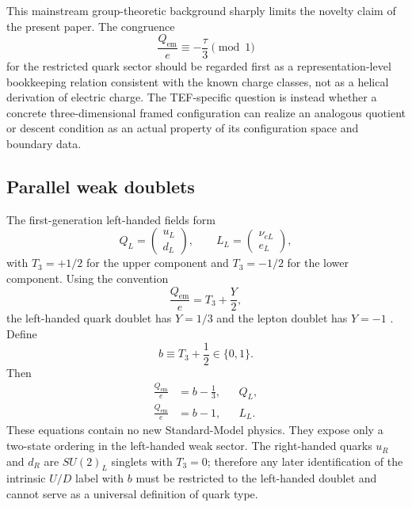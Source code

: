 \documentclass[aps,prd,reprint,superscriptaddress,nofootinbib,longbibliography,floatfix]{revtex4-2}
\newcommand{\Qem}{Q_{\mathrm{em}}}
\begin{document}
This mainstream group-theoretic background sharply limits the novelty claim of the present paper. The congruence
\begin{equation}
\boxed{\frac{\Qem}{e}\equiv-\frac{\tau}{3}\pmod1}
\label{eq:chargecongruence}
\end{equation}
for the restricted quark sector should be regarded first as a representation-level bookkeeping relation consistent with the known charge classes, not as a helical derivation of electric charge. The TEF-specific question is instead whether a concrete three-dimensional framed configuration can realize an analogous quotient or descent condition as an actual property of its configuration space and boundary data.

\subsection{Parallel weak doublets}

The first-generation left-handed fields form
\begin{equation}
Q_L=\begin{pmatrix}u_L\\ d_L\end{pmatrix},
\qquad
L_L=\begin{pmatrix}\nu_{eL}\\ e_L\end{pmatrix},
\label{eq:doublets}
\end{equation}
with $T_3=+1/2$ for the upper component and $T_3=-1/2$ for the lower component. Using the convention
\begin{equation}
\frac{\Qem}{e}=T_3+\frac{Y}{2},
\label{eq:smcharge}
\end{equation}
the left-handed quark doublet has $Y=1/3$ and the lepton doublet has $Y=-1$ \cite{PDG2026}. Define
\begin{equation}
b\equiv T_3+\frac12\in\{0,1\}.
\label{eq:bindex}
\end{equation}
Then
\begin{align}
\frac{\Qem}{e}&=b-\frac13,
&&Q_L,\label{eq:qbinary}\\
\frac{\Qem}{e}&=b-1,
&&L_L.\label{eq:lbinary}
\end{align}
These equations contain no new Standard-Model physics. They expose only a two-state ordering in the left-handed weak sector. The right-handed quarks $u_R$ and $d_R$ are $SU(2)_L$ singlets with $T_3=0$; therefore any later identification of the intrinsic $U/D$ label with $b$ must be restricted to the left-handed doublet and cannot serve as a universal definition of quark type.
\end{document}

